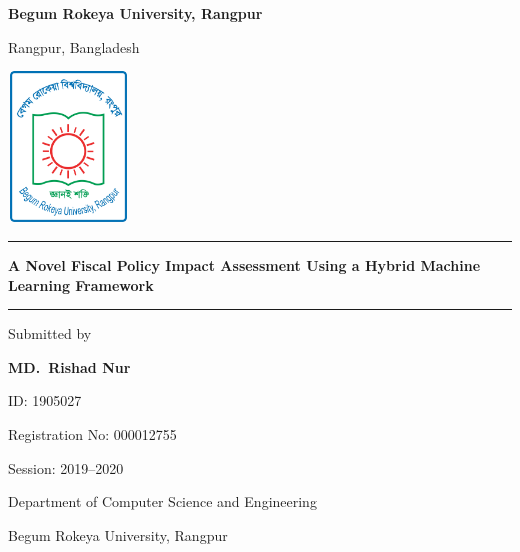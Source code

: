 \begin{titlepage}
    \centering
        
        {\LARGE\bfseries Begum Rokeya University, Rangpur\par}
        {\large Rangpur, Bangladesh\par}
        
        \vspace{1cm}
        
        \includegraphics[width=3.2cm,height=4cm]{images/BRUR_Logo.png}
        
        \vspace{1cm}
        
        \vspace{0.3cm}
        \rule{\textwidth}{0.5pt}

        \vspace{0.6cm}

        {\LARGE\bfseries A Novel Fiscal Policy Impact Assessment Using a Hybrid Machine Learning Framework\par}

        \vspace{0.3cm}
        \rule{\textwidth}{0.4pt}

        \vspace{2cm}
        
        Submitted by\par
        \textbf{MD.\ Rishad Nur}\par
        ID: 1905027\par
        Registration No: 000012755\par
        Session: 2019--2020\par
        Department of Computer Science and Engineering\par
        Begum Rokeya University, Rangpur\par

        \vspace{1cm}


\end{titlepage}
